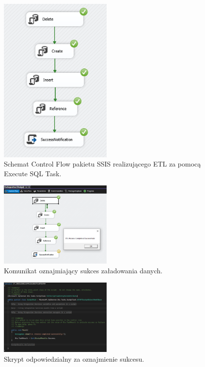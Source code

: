\documentclass[a4paper,12pt]{article}
\begin{document}
\begin{figure}[H]
    \centering
    \includegraphics[width=0.5\textwidth]{images/4_success_2.png}
    \caption{Schemat Control Flow pakietu SSIS realizującego ETL za pomocą Execute SQL Task.}
    \label{fig:zad4_control_flow_2}
\end{figure}

\begin{figure}[H]
    \centering
    \includegraphics[width=0.5\textwidth]{images/4_success.png}
    \caption{Komunikat oznajmiający sukces załadowania danych.}
    \label{fig:zad4_control_flow}
\end{figure}

\begin{figure}[H]
    \centering
    \includegraphics[width=0.5\textwidth]{images/4_script.png}
    \caption{Skrypt odpowiedzialny za oznajmienie sukcesu.}
    \label{fig:zad4_script}
\end{figure}
\end{document}
